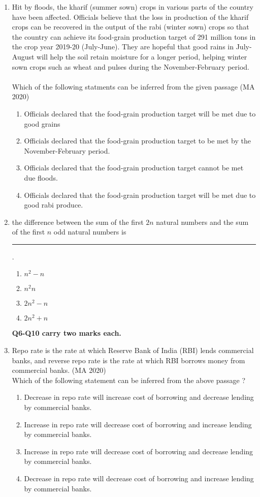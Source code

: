 \documentclass[journal,12pt,onecolumn]{IEEEtran}
\theoremstyle{remark}
\begin{document}
\begin{enumerate}
\item  	Hit by floods, the kharif (summer sown) crops in various parts of the country have been affected. Officials believe that the loss in production of the kharif crops can be recovered in the output of the rabi (winter sown) crops so that the country can achieve its food-grain production target of 291 million tons in the crop year 2019-20 (July-June). They are hopeful that good rains in July-August will help the soil retain moisture for a longer period, helping winter sown crops such as wheat and pulses during the November-February period.
\\
\\
Which of the following statments can be inferred from the given passage
\hfill{(MA 2020)}
\begin{enumerate}
\item Officials declared that the food-grain production target will be met due to good grains
\item Officials declared that the food-grain production target to be met by the November-February period.
\item Officials declared that the food-grain production target cannot be met due floods.
\item Officials declared that the food-grain production target will be met due to good rabi produce.
\end{enumerate}
 
 
 \item the difference between the sum of the first $2n$ natural numbers and the sum of the first $n$ odd natural numbers is \rule{2cm}{0.4pt}.
 \begin{enumerate}
\item $n^2-n$
\item $n^2n$
\item $2n^2-n$
\item $2n^2+n$
\end{enumerate}

\textbf{Q6-Q10 carry two marks each.}
 \item Repo rate is the rate at which Reserve Bank of India (RBI) lends commercial banks, and reverse repo rate is the rate at which RBI borrows money from commercial banks.
 \hfill{(MA 2020)}
 \\ 
Which of the following statement can be inferred from the above passage ?

 \begin{enumerate}
\item Decrease in repo rate will increase cost of borrowing and decrease lending by commercial banks.
\item Increase in repo rate will decrease cost of borrowing and increase lending by commercial banks.
\item Increase in repo rate will decrease cost of borrowing and decrease lending by commercial banks.
\item Decrease in repo rate will decrease cost of borrowing and increase lending by commercial banks.
\end{enumerate}


\end{enumerate}
\end{document}

